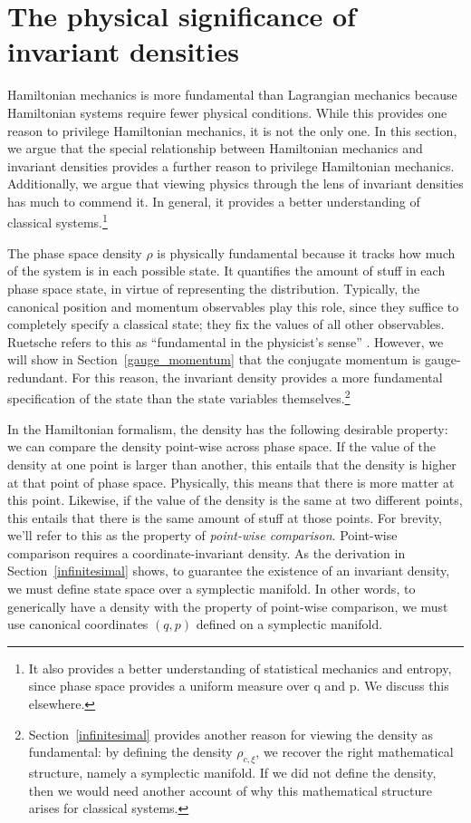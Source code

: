 \documentclass[12pt, english, twoside]{article} %
\begin{document}
\section{The physical significance of invariant densities}
\label{density}

Hamiltonian mechanics is more fundamental than Lagrangian mechanics because Hamiltonian systems require fewer physical conditions. While this provides one reason to privilege Hamiltonian mechanics, it is not the only one. In this section, we argue that the special relationship between Hamiltonian mechanics and invariant densities provides a further reason to privilege Hamiltonian mechanics. Additionally, we argue that viewing physics through the lens of invariant densities has much to commend it. In general, it provides a better understanding of classical systems.\footnote{It also provides a better understanding of statistical mechanics and entropy, since phase space provides a uniform measure over q and p. We discuss this elsewhere.}

The phase space density $\rho$ is physically fundamental because it tracks how much of the system is in each possible state. It quantifies the amount of stuff in each phase space state, in virtue of representing the distribution. Typically, the canonical position and momentum observables play this role, since they suffice to completely specify a classical state; they fix the values of all other observables. Ruetsche refers to this as ``fundamental in the physicist's sense'' \parencite*[31, 200]{Ruetsche}. However, we will show in Section~\ref{gauge_momentum} that the conjugate momentum is gauge-redundant. For this reason, the invariant density provides a more fundamental specification of the state than the state variables themselves.\footnote{Section~\ref{infinitesimal} provides another reason for viewing the density as fundamental: by defining the density $\rho_{c, \xi}$, we recover the right mathematical structure, namely a symplectic manifold. If we did not define the density, then we would need another account of why this mathematical structure arises for classical systems.}

In the Hamiltonian formalism, the density has the following desirable property: we can compare the density point-wise across phase space. If the value of the density at one point is larger than another, this entails that the density is higher at that point of phase space. Physically, this means that there is more matter at this point. Likewise, if the value of the density is the same at two different points, this entails that there is the same amount of stuff at those points. For brevity, we'll refer to this as the property of \textit{point-wise comparison}. Point-wise comparison requires a coordinate-invariant density. As the derivation in Section~\ref{infinitesimal} shows, to guarantee the existence of an invariant density, we must define state space over a symplectic manifold. In other words, to generically have a density with the property of point-wise comparison, we must use canonical coordinates $(q, p)$ defined on a symplectic manifold. 
\end{document}
